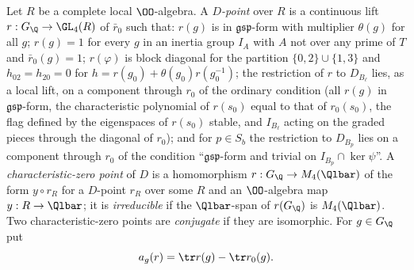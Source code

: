 \begin{definition}
Let $R$ be a complete local $\OO$-algebra. A \emph{$D$-point} over $R$ is a continuous lift $r:G_\Q\to\GL_4(R)$ of $\bar
r_0$ such that: $r(g)$ is in $\mathfrak{gsp}$-form with multiplier $\theta(g)$ for all $g$; $r(g)=1$ for every $g$ in
an inertia group $I_A$ with $A$ not over any prime of $T$ and $\bar r_0(g)=1$; $r(\varphi)$ is block diagonal for the
partition $\{0,2\}\cup\{1,3\}$ and $h_{02}=h_{20}=0$ for $h=r(g_0)+\theta(g_0)r(g_0^{-1})$; the restriction of $r$ to
$D_{B_\ell}$ lies, as a local lift, on a component through $r_0$ of the ordinary condition (all $r(g)$ in
$\mathfrak{gsp}$-form, the characteristic polynomial of $r(s_0)$ equal to that of $r_0(s_0)$, the flag defined by the
eigenspaces of $r(s_0)$ stable, and $I_{B_\ell}$ acting on the graded pieces through the diagonal of $r_0$); and for
$p\in S_b$ the restriction to $D_{B_p}$ lies on a component through $r_0$ of the condition ``$\mathfrak{gsp}$-form and
trivial on $I_{B_p}\cap\ker\psi$''. A \emph{characteristic-zero point} of $D$ is a homomorphism
$r:G_\Q\to M_4(\Qlbar)$ of the form $y\circ r_R$ for a $D$-point $r_R$ over some $R$ and an $\OO$-algebra map
$y:R\to\Qlbar$; it is \emph{irreducible} if the $\Qlbar$-span of $r(G_\Q)$ is $M_4(\Qlbar)$. Two characteristic-zero
points are \emph{conjugate} if they are isomorphic. For $g\in G_\Q$ put
\[
 a_g(r)=\tr r(g)-\tr r_0(g).
\]
\end{definition}

